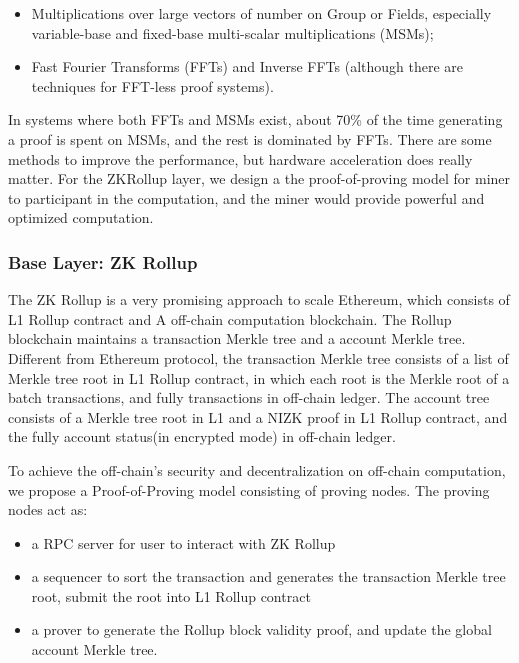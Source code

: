 \documentclass{article}
\begin{document}
\begin{itemize}
    \item Multiplications over large vectors of number on Group or Fields, especially variable-base and fixed-base multi-scalar multiplications (MSMs);
    \item Fast Fourier Transforms (FFTs) and Inverse FFTs (although there are techniques for FFT-less proof systems).
\end{itemize}

In systems where both FFTs and MSMs exist, about 70\% of the time generating a proof is spent on MSMs, and the rest is dominated by FFTs. There are some methods to improve the performance, but hardware acceleration does really matter.  For the ZKRollup layer, we design a the proof-of-proving model for miner to participant in the computation, and the miner would provide powerful and optimized computation.


\subsubsection{Base Layer: ZK Rollup}

The ZK Rollup is a very promising approach to scale Ethereum, which consists of L1 Rollup contract and A off-chain computation blockchain. The Rollup blockchain maintains a transaction Merkle tree and a account Merkle tree. Different from Ethereum protocol, the transaction Merkle tree consists of a list of Merkle tree root in L1 Rollup contract, in which each root is the Merkle root of a batch transactions, and fully transactions in off-chain ledger. The account tree consists of a Merkle tree root in L1 and a NIZK proof in L1 Rollup contract, and the fully account status(in encrypted mode) in off-chain ledger.

To achieve the off-chain's security and decentralization on off-chain computation, we propose a Proof-of-Proving model consisting of proving nodes. The proving nodes act as:
\begin{itemize}
    \item a RPC server for user to interact with ZK Rollup
    \item a sequencer to sort the transaction and generates the transaction Merkle tree root, submit the root into L1 Rollup contract
    \item a prover to generate the Rollup block validity proof, and update the global account Merkle tree.
\end{itemize}
\end{document}
